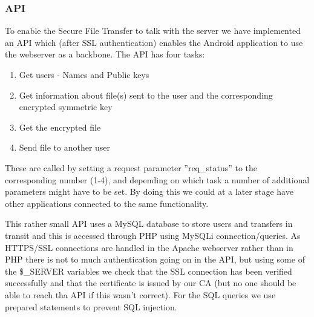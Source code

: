 \subsubsection*{API}
To enable the Secure File Transfer to talk with the server we have implemented an API which (after SSL authentication) enables the Android application to use the webserver as a backbone. The API has four tasks:

\begin{enumerate}
\item Get users - Names and Public keys
\item Get information about file(s) sent to the user and the corresponding encrypted symmetric key
\item Get the encrypted file
\item Send file to another user
\end{enumerate}

These are called by setting a request parameter ''req\_status'' to the corresponding number (1-4), and depending on which task a number of additional parameters might have to be set. By doing this we could at a later stage have other applications connected to the same functionality. 

This rather small API uses a MySQL database to store users and transfers in transit and this is accessed through PHP using MySQLi connection/queries. As HTTPS/SSL connections are handled in the Apache webserver rather than in PHP there is not to much authentication going on in the API, but using some of the  \$\_SERVER variables we check that the SSL connection has been verified successfully and that the certificate is issued by our CA (but no one should be able to reach tha API if this wasn't correct). For the SQL queries we use prepared statements to prevent SQL injection.
